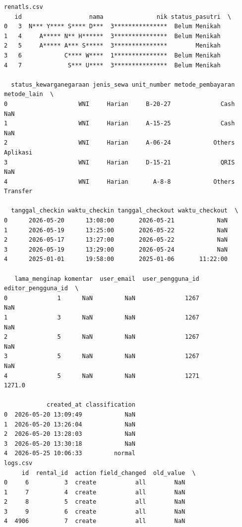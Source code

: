 \begin{lstlisting}[caption={Output 21}]
renatls.csv
   id                   nama               nik status_pasutri  \
0   3  N*** Y**** S**** D***  3***************  Belum Menikah   
1   4     A***** N** H******  3***************  Belum Menikah   
2   5     A***** A*** S*****  3***************        Menikah   
3   6            C**** W****  1***************  Belum Menikah   
4   7             S*** U****  3***************  Belum Menikah   

  status_kewarganegaraan jenis_sewa unit_number metode_pembayaran metode_lain  \
0                    WNI     Harian     B-20-27              Cash         NaN   
1                    WNI     Harian     A-15-25              Cash         NaN   
2                    WNI     Harian     A-06-24            Others    Aplikasi   
3                    WNI     Harian     D-15-21              QRIS         NaN   
4                    WNI     Harian       A-8-8            Others    Transfer   

  tanggal_checkin waktu_checkin tanggal_checkout waktu_checkout  \
0      2026-05-20      13:08:00       2026-05-21            NaN   
1      2026-05-19      13:25:00       2026-05-22            NaN   
2      2026-05-17      13:27:00       2026-05-22            NaN   
3      2026-05-19      13:29:00       2026-05-24            NaN   
4      2025-01-01      19:58:00       2025-01-06       11:22:00   

   lama_menginap komentar  user_email  user_pengguna_id  editor_pengguna_id  \
0              1      NaN         NaN              1267                 NaN   
1              3      NaN         NaN              1267                 NaN   
2              5      NaN         NaN              1267                 NaN   
3              5      NaN         NaN              1267                 NaN   
4              5      NaN         NaN              1271              1271.0   

            created_at classification  
0  2026-05-20 13:09:49            NaN  
1  2026-05-20 13:26:04            NaN  
2  2026-05-20 13:28:03            NaN  
3  2026-05-20 13:30:18            NaN  
4  2026-05-25 10:06:33         normal  
logs.csv
     id  rental_id  action field_changed  old_value  \
0     6          3  create           all        NaN   
1     7          4  create           all        NaN   
2     8          5  create           all        NaN   
3     9          6  create           all        NaN   
4  4906          7  create           all        NaN   


\end{lstlisting}

